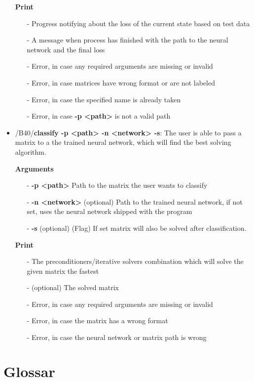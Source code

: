 \documentclass[parskip=full]{scrartcl}
\begin{document}
\begin{itemize}
\textbf{Print}
	\begin{itemize}
	\item[-]Progress notifying about the loss of the current state based on test data
	\item[-]A message when process has finished with the path to the neural network and the final loss
	\item[-]Error, in case any required arguments are missing or invalid
	\item[-]Error, in case matrices have wrong format or are not labeled
	\item[-]Error, in case the specified name is already taken
	\item[-]Error, in case \textbf{-p <path>} is not a valid path
	\end{itemize}

\item/B40/\textbf{classify -p <path> -n <network> -s}:
\newline The user is able to pass a matrix to a the trained neural network, which will find the best solving algorithm.

\textbf{Arguments}
	\begin{itemize}
	\item[-]\textbf{-p <path>} Path to the matrix the user wants to classify
	\item[-]\textbf{-n <network>} (optional) Path to the trained neural network, if not set, uses the neural network shipped with the program
	\item[-]\textbf{-s} (optional) (Flag) If set matrix will also be solved after classification.
	\end{itemize}

\textbf{Print}
	\begin{itemize}
	\item[-]The \glspl{preconditioner}/\glspl{iterative solver} combination which will solve the given matrix the fastest
	\item[-](optional) The solved matrix
	\item[-]Error, in case any required arguments are missing or invalid
	\item[-]Error, in case the matrix has a wrong format
	\item[-]Error, in case the neural network or matrix path is wrong
	\end{itemize}
\end{itemize}
\clearpage

\section{Glossar}

%
\printnoidxglossaries
\end{document}
